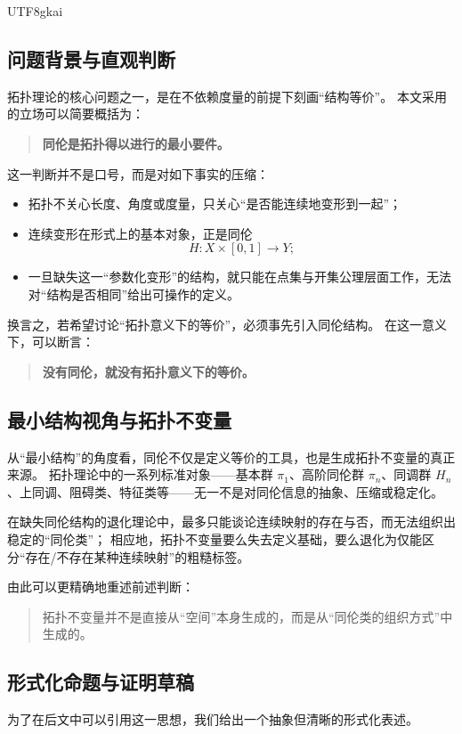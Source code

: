 \documentclass[12pt]{article}
\begin{document}
\begin{CJK*}{UTF8}{gkai}
\subsection{问题背景与直观判断}

拓扑理论的核心问题之一，是在不依赖度量的前提下刻画“结构等价”。
本文采用的立场可以简要概括为：
\begin{quote}
\textbf{同伦是拓扑得以进行的最小要件。}
\end{quote}

这一判断并不是口号，而是对如下事实的压缩：
\begin{itemize}
  \item 拓扑不关心长度、角度或度量，只关心“是否能连续地变形到一起”；
  \item 连续变形在形式上的基本对象，正是同伦
  \[
    H\colon X\times[0,1]\to Y ;
  \]
  \item 一旦缺失这一“参数化变形”的结构，就只能在点集与开集公理层面工作，无法对“结构是否相同”给出可操作的定义。
\end{itemize}

换言之，若希望讨论“拓扑意义下的等价”，必须事先引入同伦结构。
在这一意义下，可以断言：
\begin{quote}
\textbf{没有同伦，就没有拓扑意义下的等价。}
\end{quote}

\subsection{最小结构视角与拓扑不变量}

从“最小结构”的角度看，同伦不仅是定义等价的工具，也是生成拓扑不变量的真正来源。
拓扑理论中的一系列标准对象——基本群 $\pi_1$、高阶同伦群 $\pi_n$、同调群 $H_n$、上同调、阻碍类、特征类等——无一不是对同伦信息的抽象、压缩或稳定化。

在缺失同伦结构的退化理论中，最多只能谈论连续映射的存在与否，而无法组织出稳定的“同伦类”；
相应地，拓扑不变量要么失去定义基础，要么退化为仅能区分“存在/不存在某种连续映射”的粗糙标签。

由此可以更精确地重述前述判断：
\begin{quote}
拓扑不变量并不是直接从“空间”本身生成的，而是从“同伦类的组织方式”中生成的。
\end{quote}

\subsection{形式化命题与证明草稿}

为了在后文中可以引用这一思想，我们给出一个抽象但清晰的形式化表述。


\end{CJK*}
\end{document}
